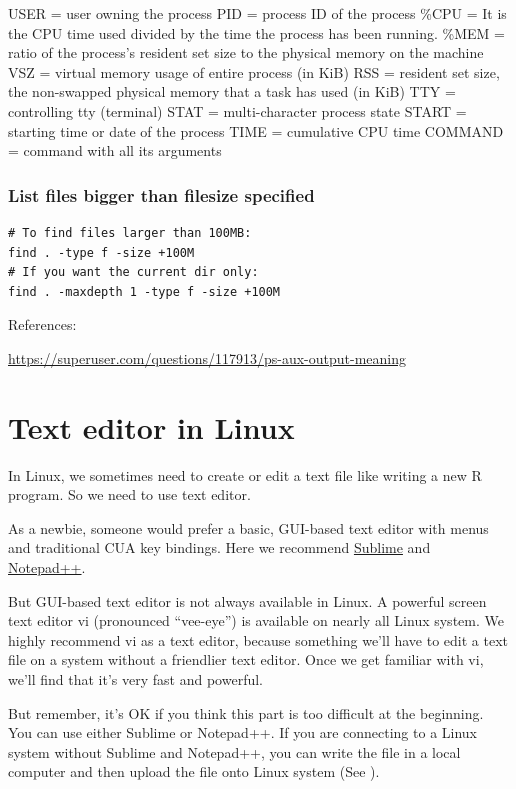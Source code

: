 \documentclass[]{book}
\theoremstyle{definition}
\theoremstyle{definition}
\theoremstyle{definition}
\theoremstyle{remark}
\begin{document}
USER = user owning the process PID = process ID of the process \%CPU =
It is the CPU time used divided by the time the process has been
running. \%MEM = ratio of the process's resident set size to the
physical memory on the machine VSZ = virtual memory usage of entire
process (in KiB) RSS = resident set size, the non-swapped physical
memory that a task has used (in KiB) TTY = controlling tty (terminal)
STAT = multi-character process state START = starting time or date of
the process TIME = cumulative CPU time COMMAND = command with all its
arguments

\subsection{List files bigger than filesize
specified}\label{list-files-bigger-than-filesize-specified}

\begin{verbatim}
# To find files larger than 100MB:
find . -type f -size +100M
# If you want the current dir only:
find . -maxdepth 1 -type f -size +100M
\end{verbatim}

References:

\url{https://superuser.com/questions/117913/ps-aux-output-meaning}

\chapter{Text editor in Linux}\label{text-editor-in-linux}

In Linux, we sometimes need to create or edit a text file like writing a
new R program. So we need to use text editor.

As a newbie, someone would prefer a basic, GUI-based text editor with
menus and traditional CUA key bindings. Here we recommend
\href{https://www.sublimetext.com/}{Sublime} and
\href{https://notepad-plus-plus.org/}{Notepad++}.

But GUI-based text editor is not always available in Linux. A powerful
screen text editor vi (pronounced ``vee-eye'') is available on nearly
all Linux system. We highly recommend vi as a text editor, because
something we'll have to edit a text file on a system without a
friendlier text editor. Once we get familiar with vi, we'll find that
it's very fast and powerful.

But remember, it's OK if you think this part is too difficult at the
beginning. You can use either Sublime or Notepad++. If you are
connecting to a Linux system without Sublime and Notepad++, you can
write the file in a local computer and then upload the file onto Linux
system (See ).
\end{document}
